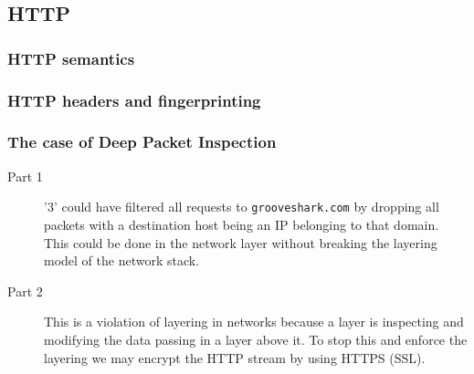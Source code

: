 \documentclass[a4paper]{article}
\begin{document}
\subsection{HTTP}
\subsubsection{HTTP semantics}
\subsubsection{HTTP headers and fingerprinting}

\subsubsection{The case of Deep Packet Inspection}
\begin{description}
    \item[Part 1] '3' could have filtered all requests to \texttt{grooveshark.com} by dropping all packets
        with a destination host being an IP belonging to that domain. This could be done in the network layer without
        breaking the layering model of the network stack.
    \item[Part 2] This is a violation of layering in networks because a layer is inspecting and modifying
        the data passing in a layer above it. To stop this and enforce the layering we may encrypt the HTTP
        stream by using HTTPS (SSL).
\end{description}


\end{document}
